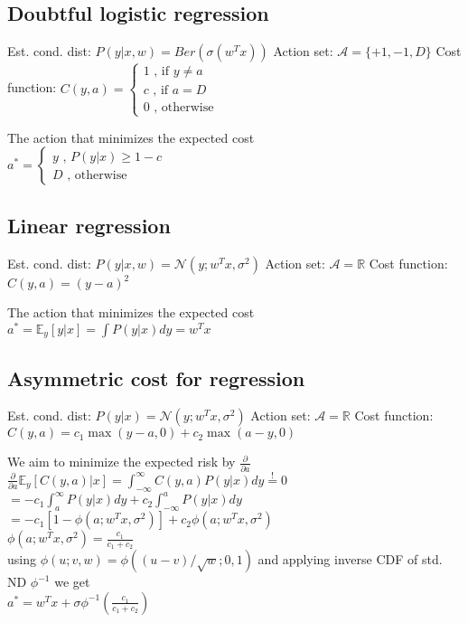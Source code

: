 \subsection*{Doubtful logistic regression}
\begin{itemize}
	 Est. cond. dist: $P(y|x,w) = Ber(\sigma(w^Tx))$
	 Action set: $\mathcal{A} = \{ +1, -1, D\}$
	 Cost function: $C(y,a) = \left \{ 
		\begin{array}{lr}
			1 \text{ , if } y \not = a\\
			c \text{ , if } a = D\\
			0 \text{ , otherwise} 
		\end{array}
		$
\end{itemize}
The action that minimizes the expected cost\\
$a^* = \left \{
	\begin{array}{lr}
		y \text{ , $P(y|x) \geq 1-c$}\\
		D \text{ , otherwise}
	\end{array}
$

\subsection*{Linear regression}
\begin{itemize}
	 Est. cond. dist: $P(y|x,w) = \mathcal{N}(y;w^Tx, \sigma^2)$
	 Action set: $\mathcal{A} = \mathbb{R}$
	 Cost function: $C(y,a) = (y-a)^2$
\end{itemize}
The action that minimizes the expected cost\\
$a^* = \mathbb{E}_y[y|x] = \int P(y | x) dy = w^Tx$

\subsection*{Asymmetric cost for regression}
\begin{itemize}
	 Est. cond. dist: $P(y|x) = \mathcal{N}(y;w^Tx, \sigma^2)$
	 Action set: $\mathcal{A} = \mathbb{R}$
	 Cost function: $C(y,a) = c_1 \max(y-a,0) + c_2 \max(a-y,0)$
\end{itemize}
We aim to minimize the expected risk by $\frac{\partial}{\partial a}$\\
$\frac{\partial}{\partial a} \mathbb{E}_y[C(y,a)|x] = \int_{-\infty}^{\infty} C(y,a) P(y | x) dy \overset{!}{=} 0$\\
$= -c_1 \int_{a}^{\infty} P(y | x) dy + c_2 \int_{-\infty}^{a} P(y | x) dy$\\
$= -c_1 [1-\phi(a; w^Tx, \sigma^2)] + c_2 \phi(a; w^Tx, \sigma^2)$\\
$\phi(a; w^Tx, \sigma^2) = \frac{c_1}{c_1 + c_2}$\\
using $\phi(u;v,w) = \phi((u-v)/\sqrt{w};0,1)$ and applying inverse CDF of std. ND $\phi^{-1}$ we get\\
$a^* = w^Tx + \sigma\phi^{-1} (\frac{c_1}{c_1 + c_2})$